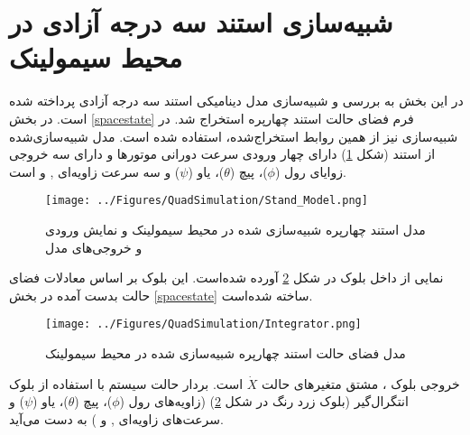\section{شبیه‌سازی استند سه درجه آزادی در محیط سیمولینک}\label{quadall3}
در این بخش به بررسی و شبیه‌سازی مدل دینامیکی استند سه درجه آزادی پرداخته شده است. در بخش \ref{spacestate} فرم فضای حالت استند چهارپره استخراج شد. در شبیه‌سازی نیز از همین روابط استخراج‌شده، استفاده شده است. مدل شبیه‌سازی‌شده از استند (شکل \ref{quadsimulink}) دارای چهار ورودی سرعت دورانی موتورها  و دارای سه خروجی زوایای رول ($\phi$)، پیچ ($\theta$)، یاو ($\psi$) و  سه سرعت زاویه‌ای
 ,
 و 
 است.
 
 	\hspace*{0.5cm}
\begin{figure}[H]
	\texttt{[image: ../Figures/QuadSimulation/Stand\_Model.png]}
	\centering
	\caption{مدل استند چهارپره شبیه‌سازی شده در محیط سیمولینک و نمایش ورودی و خروجی‌های مدل}
	\label{quadsimulink}
\end{figure}
نمایی از داخل بلوک
در شکل \ref{Quad3DOF} آورده شده‌است. این بلوک بر اساس معادلات فضای حالت بدست آمده در بخش
\ref{spacestate}
ساخته شده‌است.
	\hspace*{1.5cm}
\begin{figure}[H]
	\texttt{[image: ../Figures/QuadSimulation/Integrator.png]}
	\centering
	\caption{مدل فضای حالت استند چهارپره شبیه‌سازی شده در محیط سیمولینک}
	\label{Quad3DOF}
\end{figure}
خروجی بلوک
،
مشتق متغیرهای حالت 
$\dot X$
است. بردار حالت سیستم با استفاده از بلوک انتگرال‌گیر (بلوک زرد رنگ در شکل \ref{Quad3DOF})
 (زاویه‌های رول ($\phi$)، پیچ ($\theta$)، یاو ($\psi$) و سرعت‌های زاویه‌ای‌
 ,
و 
)
به دست می‌آید.

